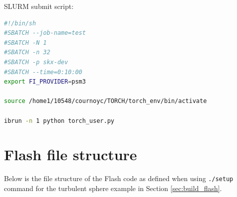 \documentclass[10pt]{article}
\begin{document}
SLURM submit script:
\begin{lstlisting}[language=bash]
#!/bin/sh
#SBATCH --job-name=test
#SBATCH -N 1
#SBATCH -n 32
#SBATCH -p skx-dev
#SBATCH --time=0:10:00
export FI_PROVIDER=psm3

source /home1/10548/cournoyc/TORCH/torch_env/bin/activate

ibrun -n 1 python torch_user.py
\end{lstlisting}

\newpage
\section{Flash file structure}
\label{sec:flash_files}
Below is the file structure of the Flash code as defined when using \texttt{./setup} command 
for the turbulent sphere example in Section \ref{sec:build_flash}.
\end{document}
